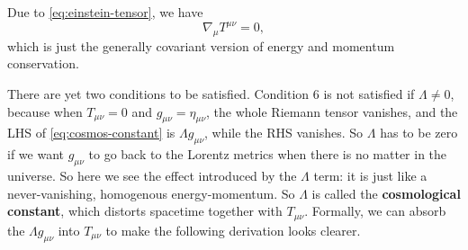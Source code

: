 \documentclass[hyperref, a4paper]{article}
\newcommand*{\concept}[1]{{\textbf{#1}}}
\begin{document}
Due to \eqref{eq:einstein-tensor}, we have 
\begin{equation}
    \nabla_\mu T^{\mu \nu} = 0,
\end{equation}
which is just the generally covariant version of energy and momentum conservation. 

There are yet two conditions to be satisfied. Condition 6 is not satisfied if $\Lambda \neq 0$, 
because when $T_{\mu \nu} = 0$ and $g_{\mu \nu} = \eta_{\mu \nu}$, the whole Riemann tensor 
vanishes, and the LHS of \eqref{eq:cosmos-constant} is $\Lambda g_{\mu \nu}$, while the RHS vanishes.
So $\Lambda$ has to be zero if we want $g_{\mu \nu}$ to go back to the Lorentz metrics when 
there is no matter in the universe. So here we see the effect introduced by the $\Lambda$ term: 
it is just like a never-vanishing, homogenous energy-momentum. So $\Lambda$ is called the 
\concept{cosmological constant}, which distorts spacetime together with $T_{\mu \nu}$. 
Formally, we can absorb the $\Lambda g_{\mu \nu}$ into $T_{\mu \nu}$ to make the following derivation 
looks clearer. 
\end{document}
